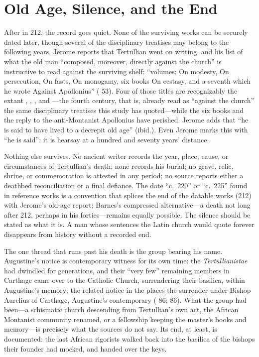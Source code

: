 \section{Old Age, Silence, and the End}

After  in 212, the record goes quiet. None of the surviving
works can be securely dated later, though several of the disciplinary treatises
may belong to the following years. Jerome reports that Tertullian went on
writing, and his list of what the old man ``composed, moreover, directly
against the church'' is instructive to read against the surviving shelf:
``volumes: On modesty, On persecution, On fasts, On monogamy, six books On
ecstasy, and a seventh which he wrote Against Apollonius'' ( 53). Four of those titles are recognizably the extant , , , and ---the fourth century, that is, already read as ``against the
church'' the same disciplinary treatises this study has quoted---while the
six books  and the reply to the anti-Montanist Apollonius
have perished. Jerome adds that ``he is said to have lived to a decrepit old
age'' (ibid.). Even Jerome marks this with ``he is said'': it is hearsay at a
hundred and seventy years' distance.

Nothing else survives. No ancient writer records the year, place, cause, or
circumstances of Tertullian's death; none records his burial; no grave, relic,
shrine, or commemoration is attested in any period; no source reports either a
deathbed reconciliation or a final defiance. The date ``c.~220'' or ``c.~225''
found in reference works is a convention that splices the end of the datable
works (212) with Jerome's old-age report; Barnes's compressed alternative---a
death not long after 212, perhaps in his forties---remains equally possible.
The silence should be stated as what it is. A man whose sentences the Latin
church would quote forever disappears from history without a recorded end.

The one thread that runs past his death is the group bearing his name.
Augustine's notice is contemporary witness for its own time: the
\textit{Tertullianistae} had dwindled for generations, and their ``very few''
remaining members in Carthage came over to the Catholic Church, surrendering
their basilica, within Augustine's memory; the related notice in the
 places the surrender under Bishop Aurelius of Carthage,
Augustine's contemporary ( 86;  86). What the
group had been---a schismatic church descending from Tertullian's own act, the
African Montanist community renamed, or a fellowship keeping the master's books
and memory---is precisely what the sources do not say. Its end, at least, is
documented: the last African rigorists walked back into the basilica of the
bishops their founder had mocked, and handed over the keys.
